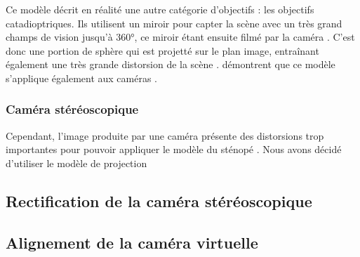 Ce modèle décrit en réalité une autre catégorie d'objectifs : les objectifs catadioptriques. Ils utilisent un miroir pour capter la scène avec un très grand champs de vision jusqu'à \ang{360}, ce miroir étant ensuite filmé par la caméra . C'est donc une portion de sphère qui est projetté sur le plan image, entraînant également une très grande distorsion de la scène . \citeauthor{Mei2007} démontrent que ce modèle s'applique également aux caméras .

\subsubsection{Caméra stéréoscopique}
Cependant, l'image produite par une caméra  présente des distorsions trop importantes pour pouvoir appliquer le modèle du sténopé . Nous avons décidé d'utiliser le modèle de projection




\subsection{Rectification de la caméra stéréoscopique}



\subsection{Alignement de la caméra virtuelle}


